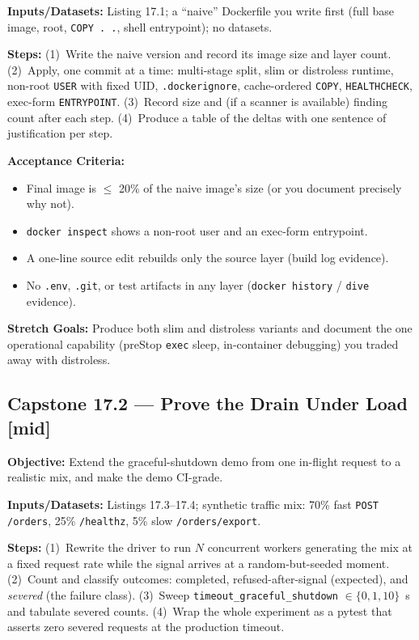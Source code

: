 \textbf{Inputs/Datasets:} Listing 17.1; a ``naive'' Dockerfile you write
first (full base image, root, \texttt{COPY . .}, shell entrypoint); no
datasets.

\textbf{Steps:} (1)~Write the naive version and record its image size
and layer count. (2)~Apply, one commit at a time: multi-stage split,
slim or distroless runtime, non-root \texttt{USER} with fixed UID,
\texttt{.dockerignore}, cache-ordered \texttt{COPY}, \texttt{HEALTHCHECK},
exec-form \texttt{ENTRYPOINT}. (3)~Record size and (if a scanner is
available) finding count after each step. (4)~Produce a table of the
deltas with one sentence of justification per step.

\textbf{Acceptance Criteria:}
\begin{itemize}
  \item[$\square$] Final image is $\leq$ 20\% of the naive image's size
        (or you document precisely why not).
  \item[$\square$] \texttt{docker inspect} shows a non-root user and an
        exec-form entrypoint.
  \item[$\square$] A one-line source edit rebuilds only the source layer
        (build log evidence).
  \item[$\square$] No \texttt{.env}, \texttt{.git}, or test artifacts in
        any layer (\texttt{docker history} / \texttt{dive} evidence).
\end{itemize}

\textbf{Stretch Goals:} Produce both slim and distroless variants and
document the one operational capability (preStop \texttt{exec} sleep,
in-container debugging) you traded away with distroless.

\subsection*{Capstone 17.2 --- Prove the Drain Under Load \hfill [mid]}
\textbf{Objective:} Extend the graceful-shutdown demo from one in-flight
request to a realistic mix, and make the demo CI-grade.

\textbf{Inputs/Datasets:} Listings 17.3--17.4; synthetic traffic mix:
70\% fast \texttt{POST /orders}, 25\% \texttt{/healthz}, 5\% slow
\texttt{/orders/export}.

\textbf{Steps:} (1)~Rewrite the driver to run $N$ concurrent workers
generating the mix at a fixed request rate while the signal arrives at
a random-but-seeded moment. (2)~Count and classify outcomes: completed,
refused-after-signal (expected), and \emph{severed} (the failure class).
(3)~Sweep \texttt{timeout\_graceful\_shutdown} $\in \{0, 1, 10\}$~s and
tabulate severed counts. (4)~Wrap the whole experiment as a pytest that
asserts zero severed requests at the production timeout.

